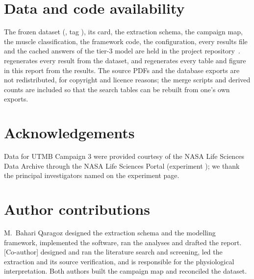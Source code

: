 \section*{Data and code availability}

The frozen dataset (, tag ), its card, the extraction schema, the
campaign map, the muscle classification, the framework code, the configuration, every results file and the cached
answers of the tier-3 model are held in the project repository~\citep{dglrm2026repo}.  regenerates
every result from the dataset, and  regenerates every table and figure in this report
from the results. The source PDFs and the database exports are not redistributed, for copyright and licence reasons;
the merge scripts and derived counts are included so that the search tables can be rebuilt from one's own exports.

\section*{Acknowledgements}

Data for UTMB Campaign 3 were provided courtesy of the NASA Life Sciences Data Archive through the NASA Life
Sciences Portal (experiment ); we thank the principal investigators
named on the experiment page. 

\section*{Author contributions}

 M.~Bahari Qaragoz designed the extraction schema and the modelling
framework, implemented the software, ran the analyses and drafted the report. [Co-author] designed and ran the
literature search and screening, led the extraction and its source verification, and is responsible for the
physiological interpretation. Both authors built the campaign map and reconciled the dataset.

